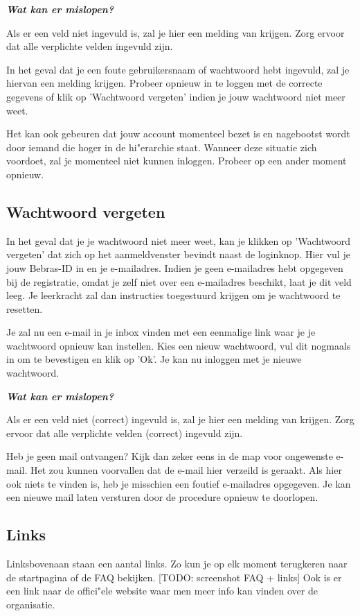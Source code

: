 \documentclass[]{article}
\begin{document}
\textbf{\textit{Wat kan er mislopen?}}

Als er een veld niet ingevuld is, zal je hier een melding van krijgen. Zorg ervoor dat alle verplichte velden ingevuld zijn.

In het geval dat je een foute gebruikersnaam of wachtwoord hebt ingevuld, zal je hiervan een melding krijgen. Probeer opnieuw in te loggen met de correcte gegevens of klik op 'Wachtwoord vergeten' indien je jouw wachtwoord niet meer weet.

Het kan ook gebeuren dat jouw account momenteel bezet is en nagebootst wordt door iemand die hoger in de hi"erarchie staat. Wanneer deze situatie zich voordoet, zal je momenteel niet kunnen inloggen. Probeer op een ander moment opnieuw.

\subsection{Wachtwoord vergeten}
In het geval dat je je wachtwoord niet meer weet, kan je klikken op 'Wachtwoord vergeten' dat zich op het aanmeldvenster bevindt naast de loginknop. Hier vul je jouw Bebras-ID in en je e-mailadres. Indien je geen e-mailadres hebt opgegeven bij de registratie, omdat je zelf niet over een e-mailadres beschikt, laat je dit veld leeg. Je leerkracht zal dan instructies toegestuurd krijgen om je wachtwoord te resetten.

Je zal nu een e-mail in je inbox vinden met een eenmalige link waar je je wachtwoord opnieuw kan instellen. Kies een nieuw wachtwoord, vul dit nogmaals in om te bevestigen en klik op 'Ok'. Je kan nu inloggen met je nieuwe wachtwoord.

\textbf{\textit{Wat kan er mislopen?}}

Als er een veld niet (correct) ingevuld is, zal je hier een melding van krijgen. Zorg ervoor dat alle verplichte velden (correct) ingevuld zijn.

Heb je geen mail ontvangen? Kijk dan zeker eens in de map voor ongewenste e-mail. Het zou kunnen voorvallen dat de e-mail hier verzeild is geraakt. Als hier ook niets te vinden is, heb je misschien een foutief e-mailadres opgegeven. Je kan een nieuwe mail laten versturen door de procedure opnieuw te doorlopen.

\subsection{Links}
Linksbovenaan staan een aantal links. Zo kun je op elk moment terugkeren naar de startpagina of de FAQ bekijken. [TODO: screenshot FAQ + links] Ook is er een link naar de offici"ele website waar men meer info kan vinden over de organisatie.
\end{document}
